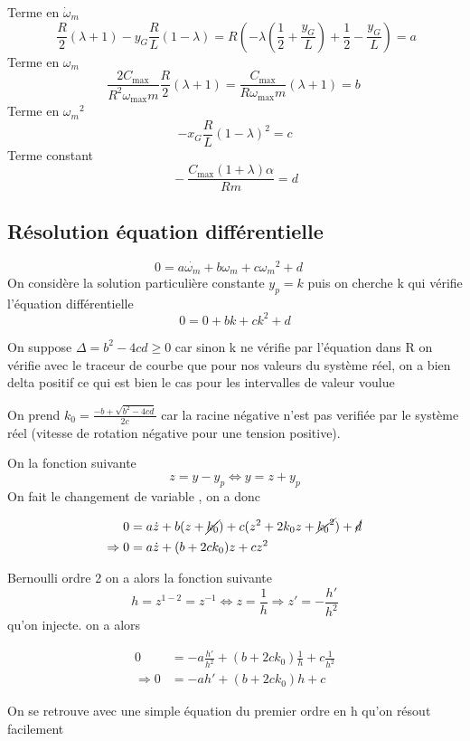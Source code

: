 \documentclass[a4paper,12pt]{report}  %
\begin{document}
Terme en $\dot{\omega}_m$
$$
\ \frac{R}{2} (\lambda + 1)- y_G \frac{R}{L} (1 - \lambda)= R(-\lambda(\frac{1}{2}+\frac{y_G}{L})+ \frac{1}{2}-\frac{y_G}{L}) = a
$$
Terme en ${\omega}_m$
$$
\frac{ 2C_{\text{max}}}{R^2 \omega_{\text{max}} m} \frac{R}{2}(\lambda + 1) = \frac{ C_{\text{max}}}{R \omega_{\text{max}} m} (\lambda + 1) = b \
$$
Terme en ${\omega_m}^2$
$$
-x_G \frac{R}{L}{(1 - \lambda)}^2 = c
$$
Terme constant 
$$
\ - \frac{C_{\text{max}} (1 + \lambda) \alpha}{R m} = d \
$$
\subsection{Résolution équation différentielle}

$$0 = a \dot{\omega_m} + b\omega_m + c {\omega_m}^2 + d \quad $$
On considère la solution particulière constante $y_p = k$ puis on cherche k qui vérifie l’équation différentielle
$$0 = 0 + bk + c k^2 + d$$


On suppose $\Delta = b^2 - 4cd \geq 0$ car sinon k ne vérifie par l'équation dans R 
on vérifie avec le traceur de courbe que pour nos valeurs du système réel, on a bien delta positif ce qui est bien le cas pour les intervalles de valeur voulue 

On prend $k_0 = \frac{-b + \sqrt{b^2 - 4cd}}{2c}$ car la racine négative n'est pas verifiée par le système réel (vitesse de rotation négative pour une tension positive).


On la fonction suivante  $$z = y-y_p \Leftrightarrow y = z + y_p$$
On fait le changement de variable , on a donc 

\begin{align*}
	0 &= a \dot{z} + b (z + \cancel{k_0}) + c (z^2+2k_0z + \cancel{{k_0}^2}) + \cancel{d}
	\\
	\Rightarrow 0 &= a \dot{z} + (b + 2c k_0){z} + c z^2
\end{align*}

Bernoulli ordre 2 on a alors la fonction suivante  
$$h = z^{1-2} = z^{-1} \Leftrightarrow z = \frac{1}{h} \Rightarrow z'= - \frac{h'}{h^2}$$
qu'on injecte. on a alors 

\begin{align*}
	0 &= -a \frac{h'}{h^2} + (b + 2 c k_0)  \frac{1}{h} + c\frac{1}{h^2}
	\\
	\Rightarrow0 &= -a h' + (b + 2 c k_0) h + c
\end{align*}

On se retrouve avec une simple équation du premier ordre en h qu'on résout facilement
\end{document}
